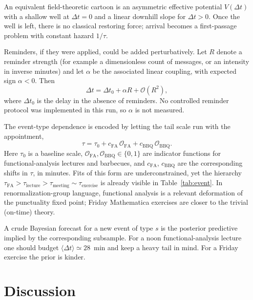 \documentclass[10pt,twocolumn]{article}
\begin{document}
An equivalent field-theoretic cartoon is an asymmetric
effective potential $V(\Delta t)$ with a shallow well at
$\Delta t=0$ and a linear downhill slope for $\Delta t>0$.
Once the well is left, there is no classical restoring
force; arrival becomes a first-passage problem with
constant hazard $1/\tau$.

Reminders, if they were applied, could be added
perturbatively. Let $R$ denote a reminder strength
(for example a dimensionless count of messages, or an
intensity in inverse minutes) and let $\alpha$ be the
associated linear coupling, with expected sign
$\alpha<0$. Then
\begin{equation}
    \Delta t
    =
    \Delta t_0 + \alpha R + \mathcal{O}(R^2),
\end{equation}
where $\Delta t_0$ is the delay in the absence of
reminders. No controlled reminder protocol was implemented
in this run, so $\alpha$ is not measured.

The event-type dependence is encoded by letting the tail
scale run with the appointment,
\begin{equation}
    \tau
    =
    \tau_0
    + c_{\mathrm{FA}}\,\mathcal{O}_{\mathrm{FA}}
    + c_{\mathrm{BBQ}}\,\mathcal{O}_{\mathrm{BBQ}}.
\end{equation}
Here $\tau_0$ is a baseline scale,
$\mathcal{O}_{\mathrm{FA}},\mathcal{O}_{\mathrm{BBQ}}\in\{0,1\}$
are indicator functions for functional-analysis lectures
and barbecues, and $c_{\mathrm{FA}}$, $c_{\mathrm{BBQ}}$
are the corresponding shifts in $\tau$, in minutes.
Fits of this form are underconstrained, yet the hierarchy
$\tau_{\mathrm{FA}} > \tau_{\mathrm{lecture}}
> \tau_{\mathrm{meeting}} \sim \tau_{\mathrm{exercise}}$
is already visible in Table~\ref{tab:event}. In
renormalization-group language, functional analysis is a
relevant deformation of the punctuality fixed point;
Friday Mathematica exercises are closer to the trivial
(on-time) theory.

A crude Bayesian forecast for a new event of type $s$ is
the posterior predictive implied by the corresponding
subsample. For a noon functional-analysis lecture one
should budget $\langle\Delta t\rangle\simeq 28$~min
and keep a heavy tail in mind. For a Friday exercise the
prior is kinder.

\section{Discussion}
\end{document}
